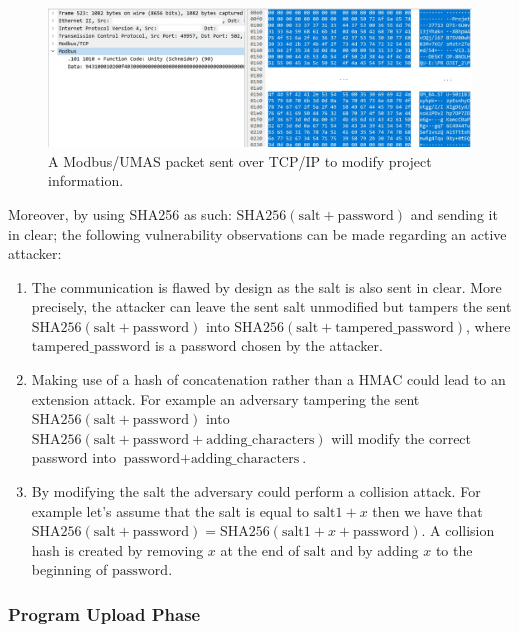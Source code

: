 \begin{figure}[H]
    \centering
    \includegraphics[width=\linewidth]{figures/project-info}
    \caption{A Modbus/UMAS packet sent over TCP/IP to modify project information.}
    \label{fig:modbus-packet-setup-phase}
\end{figure}



Moreover, by using SHA256  as such: $\textrm{SHA256}(\textrm{salt} + \textrm{password})$ and sending it in clear; the following vulnerability observations can be made regarding an active attacker: 

\begin{enumerate}
    \item The communication is flawed by design as the salt is also sent in clear. More precisely, the attacker can leave the sent salt unmodified but tampers the sent $\textrm{SHA256}(\textrm{salt}+\textrm{password})$ into $\textrm{SHA256}(\textrm{salt}+\textrm{tampered\_password})$, where $\textrm{tampered\_password}$ is a password chosen by the attacker. 
    \item  Making use of a hash of concatenation rather than a HMAC could lead to an extension attack. For example an adversary tampering the sent $\textrm{SHA256}(\textrm{salt}+\textrm{password})$ into $\textrm{SHA256}(\textrm{salt}+\textrm{password}+\textrm{adding\_characters})$ will modify the correct password into  $\textrm{password}+\textrm{adding\_characters}$.
    \item  By modifying the salt the adversary could perform a collision attack. For example let's assume that the salt is equal to $\textrm{salt1} + x$ then
    we have that $\textrm{SHA256}(\textrm{salt}+\textrm{password})=\textrm{SHA256}(\textrm{salt1}+x+\textrm{password})$. A collision hash is created by removing $x$ at the end of $\textrm{salt}$ and by adding $x$ to the beginning of $\textrm{password}$.
\end{enumerate}

\subsubsection{Program Upload Phase}

